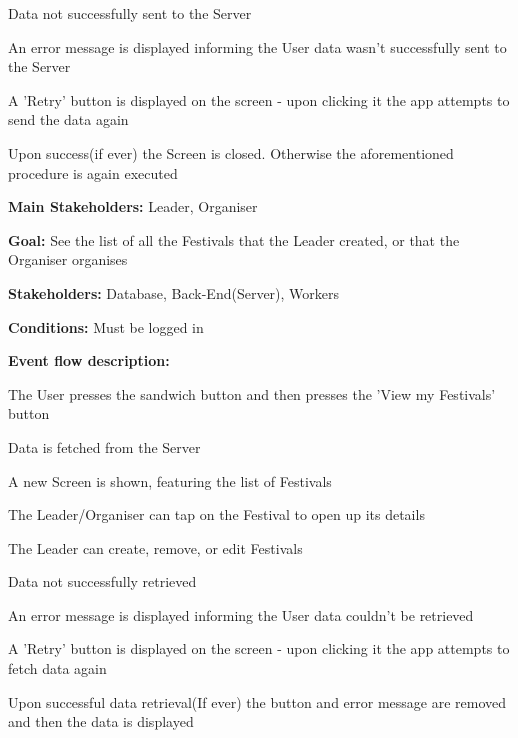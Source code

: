 \begin{packed_item}
\begin{packed_item}
						\item[5.a] Data not successfully sent to the Server
						\item[] \begin{packed_enum}
							\item An error message is displayed informing the User data wasn't successfully sent to the Server
							\item A 'Retry' button is displayed on the screen - upon clicking it the app attempts to send the data again
							\item Upon success(if ever) the Screen is closed. Otherwise the aforementioned procedure is again executed
						\end{packed_enum}
					\end{packed_item}
				\end{packed_item}	
			
				\noindent {}
				\begin{packed_item}
					\item \textbf{Main Stakeholders:} Leader, Organiser
					\item \textbf{Goal:} See the list of all the Festivals that the Leader created, or that the Organiser organises
					\item \textbf{Stakeholders: } Database, Back-End(Server), Workers
					\item \textbf{Conditions: } Must be logged in
					\item \textbf{Event flow description: }
					\begin{packed_enum}
						\item The User presses the sandwich button and then presses the 'View my Festivals' button
						\item Data is fetched from the Server
						\item A new Screen is shown, featuring the list of Festivals
						\item The Leader/Organiser can tap on the Festival to open up its details
						\item The Leader can create, remove, or edit Festivals
					\end{packed_enum}
				
					\begin{packed_item}
						\item[1.a, 4.a] Data not successfully retrieved
						\item[] \begin{packed_enum}
							\item An error message is displayed informing the User data couldn't be retrieved
							\item A 'Retry' button is displayed on the screen - upon clicking it the app attempts to fetch data again
							\item Upon successful data retrieval(If ever) the button and error message are removed and then the data is displayed
						\end{packed_enum}	
					\end{packed_item}
				\end{packed_item}
			

